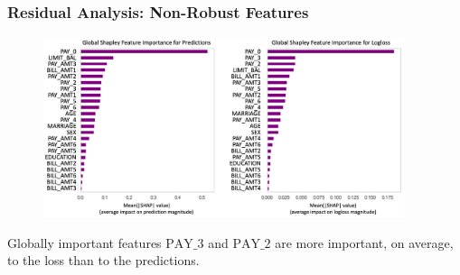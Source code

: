 \documentclass[11pt,
               aspectratio=169,
               hyperref={colorlinks}
               ]{beamer}
\begin{document}
		
		

			\begin{frame}[t]
		
				\frametitle{\large{\textbf{Residual Analysis}: Non-Robust Features}}
				\vspace{-10pt}
				\begin{figure}
					\begin{center}
						\includegraphics[height=150pt]{img/global_pred_loss.png}
					\end{center}
				\end{figure}
				\vspace{-8pt}	
				\scriptsize{Globally important features $\text{PAY\_3}$ and $\text{PAY\_2}$ are more important, on average, to the loss than to the predictions.} 
		
			\end{frame}
\end{document}

